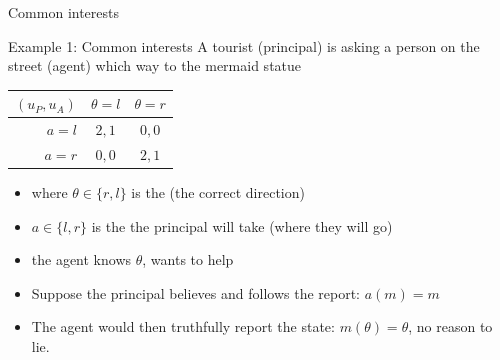 \documentclass[english,10pt
,aspectratio=169
]{beamer}
\begin{document}
\begin{frame}{Common interests}
	\begin{exampleblock}{Example 1: Common interests}
		A tourist (principal) is asking a person on the street (agent) which way to the mermaid statue
		\begin{center}
			\begin{tabular}{r | c | c |}
				$(u_P,u_A)$	& $\theta=l$	& $\theta=r$
				\\ \hline 
				$a=l$ 		& $2,1$			& $0,0$
				\\ \hline
				$a=r$		& $0,0$			& $2,1$
				\\ \hline 
			\end{tabular}
		\end{center}
	\end{exampleblock}
	 
	\begin{itemize}
		\item where $\theta\in \{r,l\}$ is the  (the correct direction)
		\item $a \in \{l,r\}$ is the  the principal will take (where they will go)
		\item the agent knows $\theta$, wants to help
		\pause \bigskip 
		\item Suppose the principal believes and follows the report: $a(m) = m$
		\pause
		\item The agent would then truthfully report the state: $m(\theta) = \theta$, no reason to lie.
	\end{itemize}
\end{frame}
\end{document}
